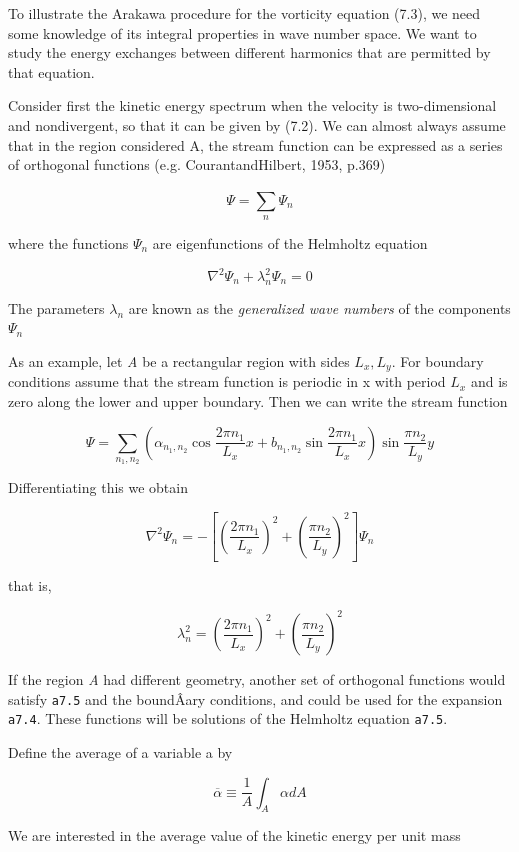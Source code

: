 To illustrate the Arakawa procedure for the vorticity equation (7.3), we
need some knowledge of its integral properties in wave number space. We
want to study the energy exchanges between different harmonics that are
permitted by that equation.

Consider first the kinetic energy spectrum when the velocity is
two-dimensional and nondivergent, so that it can be given by (7.2). We
can almost always assume that in the region considered A, the stream
function can be expressed as a series of orthogonal functions (e.g.
CourantandHilbert, 1953, p.369)

{\[\Psi = \sum_{n}^{}\Psi_{n}\]}

where the functions \(\Psi_n\) are eigenfunctions of the Helmholtz
equation

{\[\nabla^{2}\Psi_{n} + \lambda_{n}^{2}\Psi_{n} = 0\]}

The parameters \(\lambda_{n} \) are known as the \emph{generalized wave
numbers} of the components \(\Psi_{n}\)

As an example, let \emph{A} be a rectangular region with sides
\(L_x, L_y\). For boundary conditions assume that the stream function is
periodic in x with period \(L_{x}\) and is zero along the lower and
upper boundary. Then we can write the stream function

{\[\Psi = \sum_{n_1, n_2} \left( \alpha_{n_1, n_2}\cos{\frac{2\pi n_1}{L_x}x}+
b_{n_1, n_2}\sin{\frac{2\pi n_1}{L_x}x} \right)\sin{ \frac{\pi n_2}{L_y} y}\]}

Differentiating this we obtain

\[\nabla^2\Psi_n = - \left\lbrack \left( \frac{2\pi n_1}{L_x} \right)^{2} +
\left( \frac{\pi n_2}{L_y}  \right)^{2} \right\rbrack\Psi_{n}\]

that is,

\[\lambda_n^2 = \left( \frac{2\pi n_1}{L_x} \right)^{2} + \left( \frac{\pi n_2}{L_y} \right)^{2}\]

If the region \emph{A} had different geometry, another set of orthogonal
functions would satisfy \texttt{a7.5} and the boundÂ­ary conditions, and
could be used for the expansion \texttt{a7.4}. These functions will be
solutions of the Helmholtz equation \texttt{a7.5}.

Define the average of a variable a by

\[\overline{\alpha} \equiv \frac{1}{A}\int_A \alpha d A\]

We are interested in the average value of the kinetic energy per unit
mass

